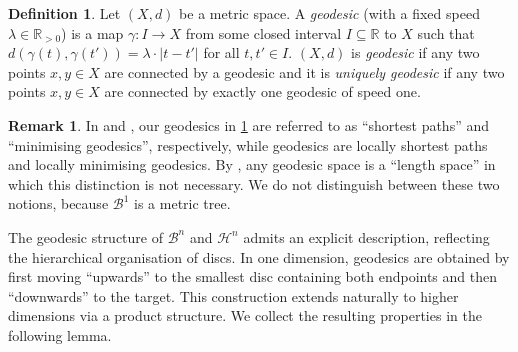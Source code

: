 \documentclass[10pt]{article}
\theoremstyle{definition}
\newtheorem{definition}[theorem]{Definition}
\newtheorem{remark}[theorem]{Remark}
\newcommand{\RR}{\mathbb{R}}
\begin{document}
\begin{definition}
  \label{def:geodesicsAndGeodesicSpace}
  Let $(X,d)$ be a metric space.  A \emph{geodesic} (with a fixed speed $\lambda\in\RR_{>0}$) is a map $\gamma\colon I\rightarrow X$ from some closed interval $I\subseteq\RR$ to $X$ such that $d(\gamma(t),\gamma(t'))=\lambda \cdot |t-t'|$ for all $t,t'\in I$. $(X,d)$ is \emph{geodesic} if any two points $x,y\in X$ are connected by a geodesic and it is \emph{uniquely geodesic} if any two points $x,y\in X$ are connected by exactly one geodesic of speed one.
\end{definition}

\begin{remark}
  \label{rem:geodesicsAndGeodesicsSpace}
  In \cite{BuragoBuragoIvanov2001} and \cite{Gromov2007}, our geodesics in \cref{def:geodesicsAndGeodesicSpace} are referred to as ``shortest paths'' and ``minimising geodesics'', respectively, while geodesics are locally shortest paths and locally minimising geodesics. By \cite[Lemma 2.2]{Lang2013}, any geodesic space is a ``length space'' in which this distinction is not necessary.  We do not distinguish between these two notions, because $\mathcal B^1$ is a metric tree. 
\end{remark}

The geodesic structure of $\mathcal{B}^n$ and $\mathcal{H}^n$ admits an explicit description, reflecting the hierarchical organisation of discs. In one dimension, geodesics are obtained by first moving ``upwards'' to the smallest disc containing both endpoints and then ``downwards'' to the target. This construction extends naturally to higher dimensions via a product structure. We collect the resulting properties in the following lemma.
\end{document}
